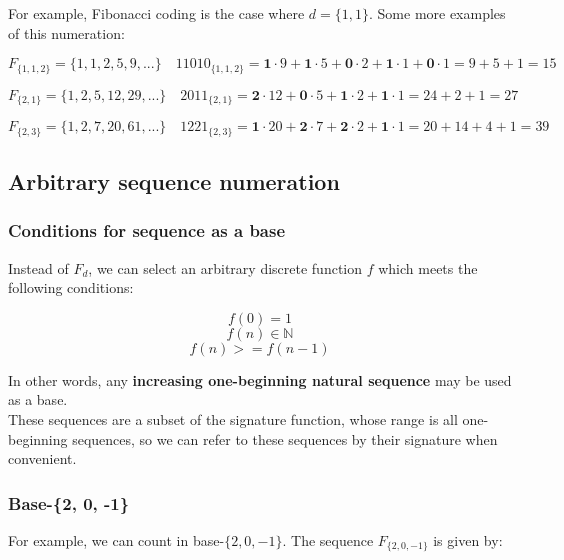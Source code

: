 \documentclass{article}
\begin{document}
\noindent For example, Fibonacci coding is the case where $d = \{1, 1\}$. Some more examples of this numeration:

\begin{equation}F_{\{1, 1, 2\}} = \{1, 1, 2, 5, 9, ...\} \quad 11010_{\{1, 1, 2\}} = \textbf{1} \cdot 9 + \textbf{1} \cdot 5 + \textbf{0} \cdot 2 + \textbf{1} \cdot 1 + \textbf{0} \cdot 1 = 9 + 5 + 1 = 15\end{equation}

\begin{equation}F_{\{2, 1\}} = \{1, 2, 5, 12, 29, ...\} \quad 2011_{\{2, 1\}} = \textbf{2} \cdot 12 + \textbf{0} \cdot 5 + \textbf{1} \cdot 2 + \textbf{1} \cdot 1 = 24 + 2 + 1 = 27\end{equation}

\begin{equation}F_{\{2, 3\}} = \{1, 2, 7, 20, 61, ...\} \quad 1221_{\{2, 3\}} = \textbf{1} \cdot 20 + \textbf{2} \cdot 7 + \textbf{2} \cdot 2 + \textbf{1} \cdot 1 = 20 + 14 + 4 + 1 = 39\end{equation}

\subsection{Arbitrary sequence numeration}

\subsubsection{Conditions for sequence as a base}

Instead of $F_{d}$, we can select an arbitrary discrete function $f$ which meets the following conditions:

$$f(0) = 1$$
$$f(n) \in \mathbb{N}$$
$$f(n) >= f(n-1)$$

\noindent In other words, any \textbf{increasing one-beginning natural sequence} may be used as a base.\\

\noindent These sequences are a subset of the signature function, whose range is all one-beginning sequences, so we can refer to these sequences by their signature when convenient.

\subsubsection{Base-\{2, 0, -1\}}

For example, we can count in base-$\{2, 0, -1\}$. The sequence $F_{\{2, 0, -1\}}$ is given by:
\end{document}
